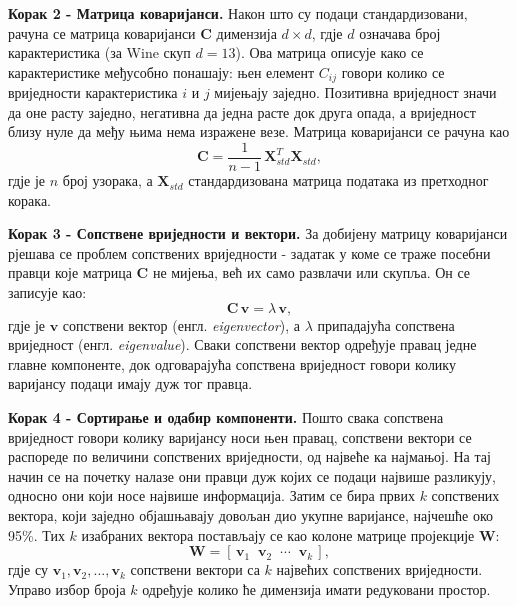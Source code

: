\documentclass{article}
\begin{document}
	\textbf{Корак 2 - Матрица коваријанси.} Након што су подаци стандардизовани, рачуна се матрица коваријанси $\mathbf{C}$ димензија $d \times d$, гдје $d$ означава број карактеристика (за Wine скуп $d = 13$). Ова матрица описује како се карактеристике међусобно понашају: њен елемент $C_{ij}$ говори колико се вриједности карактеристика $i$ и $j$ мијењају заједно. Позитивна вриједност значи да оне расту заједно, негативна да једна расте док друга опада, а вриједност близу нуле да међу њима нема изражене везе. Матрица коваријанси се рачуна као
	\begin{equation} \label{eq:pca_cov}
		\mathbf{C} = \frac{1}{n-1}\,\mathbf{X}_{std}^T \mathbf{X}_{std},
	\end{equation}
	гдје је $n$ број узорака, а $\mathbf{X}_{std}$ стандардизована матрица података из претходног корака.
	
	\textbf{Корак 3 - Сопствене вриједности и вектори.} За добијену матрицу коваријанси рјешава се проблем сопствених вриједности - задатак у коме се траже посебни правци које матрица $\mathbf{C}$ не мијења, већ их само развлачи или скупља. Он се записује као:
	\begin{equation} \label{eq:pca_eig}
		\mathbf{C}\,\mathbf{v} = \lambda\,\mathbf{v},
	\end{equation}
	гдје је $\mathbf{v}$ сопствени вектор (енгл. \textit{eigenvector}), а $\lambda$ припадајућа сопствена вриједност (енгл. \textit{eigenvalue}). Сваки сопствени вектор одређује правац једне главне компоненте, док одговарајућа сопствена вриједност говори колику варијансу подаци имају дуж тог правца.
	
	\textbf{Корак 4 - Сортирање и одабир компоненти.} Пошто свака сопствена вриједност говори колику варијансу носи њен правац, сопствени вектори се распореде по величини сопствених вриједности, од највеће ка најмањој. На тај начин се на почетку налазе они правци дуж којих се подаци највише разликују, односно они који носе највише информација. Затим се бира првих $k$ сопствених вектора, који заједно објашњавају довољан дио укупне варијансе, најчешће око 95\%. Тих $k$ изабраних вектора постављају се као колоне матрице пројекције $\mathbf{W}$:
	\begin{equation} \label{eq:pca_W_select}
		\mathbf{W} = [\,\mathbf{v}_1 \;\; \mathbf{v}_2 \;\; \cdots \;\; \mathbf{v}_k\,],
	\end{equation}
	гдје су $\mathbf{v}_1, \mathbf{v}_2, \dots, \mathbf{v}_k$ сопствени вектори са $k$ највећих сопствених вриједности. Управо избор броја $k$ одређује колико ће димензија имати редуковани простор.
	
\end{document}
